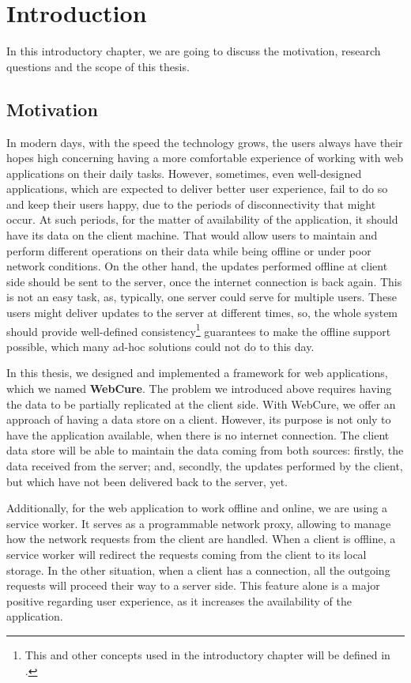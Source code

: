 \chapter{Introduction}
\label{Introduction}

In this introductory chapter, we are going to discuss the motivation, research questions and the scope of this thesis.

\section{Motivation}
\label{Introduction-Motivation}

In modern days, with the speed the technology grows, the users always have their hopes high concerning having a more comfortable experience of working with web applications on their daily tasks. However, sometimes, even well-designed applications, which are expected to deliver better user experience, fail to do so and keep their users happy, due to the periods of disconnectivity that might occur. At such periods, for the matter of availability of the application, it should have its data on the client machine. That would allow users to maintain and perform different operations on their data while being offline or under poor network conditions. On the other hand, the updates performed offline at client side should be sent to the server, once the internet connection is back again. This is not an easy task, as, typically, one server could serve for multiple users. These users might deliver updates to the server at different times, so, the whole system should provide well-defined consistency\footnote{This and other concepts used in the introductory chapter will be defined in .} guarantees to make the offline support possible, which many ad-hoc solutions could not do to this day.

In this thesis, we designed and implemented a framework for web applications, which we named \textbf{WebCure}. The problem we introduced above requires having the data to be partially replicated at the client side. With WebCure, we offer an approach of having a data store on a client. However, its purpose is not only to have the application available, when there is no internet connection. The client data store will be able to maintain the data coming from both sources: firstly, the data received from the server; and, secondly, the updates performed by the client, but which have not been delivered back to the server, yet. 

Additionally, for the web application to work offline and online, we are using a service worker. It serves as a programmable network proxy\cite{32}, allowing to manage how the network requests from the client are handled. When a client is offline, a service worker will redirect the requests coming from the client to its local storage. In the other situation, when a client has a connection, all the outgoing requests will proceed their way to a server side. This feature alone is a major positive regarding user experience, as it increases the availability of the application. 


